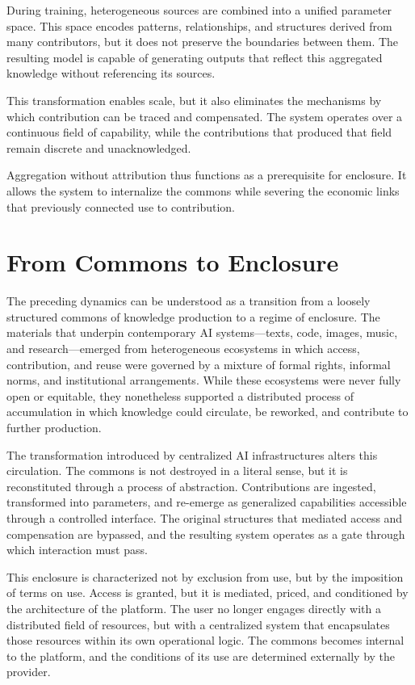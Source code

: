 \documentclass[12pt, oneside]{article}
\begin{document}
During training, heterogeneous sources are combined into a unified parameter space. This space encodes patterns, relationships, and structures derived from many contributors, but it does not preserve the boundaries between them. The resulting model is capable of generating outputs that reflect this aggregated knowledge without referencing its sources.

This transformation enables scale, but it also eliminates the mechanisms by which contribution can be traced and compensated. The system operates over a continuous field of capability, while the contributions that produced that field remain discrete and unacknowledged.

Aggregation without attribution thus functions as a prerequisite for enclosure. It allows the system to internalize the commons while severing the economic links that previously connected use to contribution.

\section{From Commons to Enclosure}

The preceding dynamics can be understood as a transition from a loosely structured commons of knowledge production to a regime of enclosure. The materials that underpin contemporary AI systems—texts, code, images, music, and research—emerged from heterogeneous ecosystems in which access, contribution, and reuse were governed by a mixture of formal rights, informal norms, and institutional arrangements. While these ecosystems were never fully open or equitable, they nonetheless supported a distributed process of accumulation in which knowledge could circulate, be reworked, and contribute to further production.

The transformation introduced by centralized AI infrastructures alters this circulation. The commons is not destroyed in a literal sense, but it is reconstituted through a process of abstraction. Contributions are ingested, transformed into parameters, and re-emerge as generalized capabilities accessible through a controlled interface. The original structures that mediated access and compensation are bypassed, and the resulting system operates as a gate through which interaction must pass.

This enclosure is characterized not by exclusion from use, but by the imposition of terms on use. Access is granted, but it is mediated, priced, and conditioned by the architecture of the platform. The user no longer engages directly with a distributed field of resources, but with a centralized system that encapsulates those resources within its own operational logic. The commons becomes internal to the platform, and the conditions of its use are determined externally by the provider.
\end{document}
